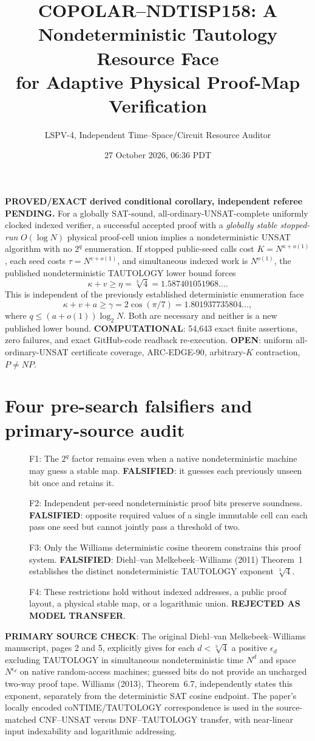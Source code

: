 \documentclass[11pt]{article}
\title{COPOLAR--NDTISP158: A Nondeterministic Tautology Resource Face\\for Adaptive Physical Proof-Map Verification}
\author{LSPV-4, Independent Time--Space/Circuit Resource Auditor}
\date{27 October 2026, 06:36 PDT}
\begin{document}
\maketitle
\noindent\textbf{PROVED/EXACT derived conditional corollary, independent referee PENDING.}
For a globally SAT-sound, all-ordinary-UNSAT-complete uniformly clocked indexed verifier, a successful accepted proof with a \emph{globally stable stopped-run} $O(\log N)$ physical proof-cell union implies a nondeterministic UNSAT algorithm with no $2^q$ enumeration. If stopped public-seed calls cost $K=N^{\kappa+o(1)}$, each seed costs $\tau=N^{v+o(1)}$, and simultaneous indexed work is $N^{o(1)}$, the published nondeterministic TAUTOLOGY lower bound forces
\[
\boxed{\kappa+v\ge \eta=\sqrt[3]{4}=1.587401051968\ldots.} \tag{A}
\]
This is independent of the previously established deterministic enumeration face
\[
\boxed{\kappa+v+a\ge\gamma=2\cos(\pi/7)=1.801937735804\ldots,} \tag{B}
\]
where $q\le(a+o(1))\log_2N$. Both are necessary and neither is a new published lower bound. \textbf{COMPUTATIONAL}: 54,643 exact finite assertions, zero failures, and exact GitHub-code readback re-execution. \textbf{OPEN}: uniform all-ordinary-UNSAT certificate coverage, ARC-EDGE-90, arbitrary-$K$ contraction, $P\ne NP$.

\section{Four pre-search falsifiers and primary-source audit}
\begin{description}
\item[] F1: The $2^q$ factor remains even when a native nondeterministic machine may guess a stable map. \textbf{FALSIFIED}: it guesses each previously unseen bit once and retains it.
\item[] F2: Independent per-seed nondeterministic proof bits preserve soundness. \textbf{FALSIFIED}: opposite required values of a single immutable cell can each pass one seed but cannot jointly pass a threshold of two.
\item[] F3: Only the Williams deterministic cosine theorem constrains this proof system. \textbf{FALSIFIED}: Diehl--van Melkebeek--Williams (2011) Theorem~1 establishes the distinct nondeterministic TAUTOLOGY exponent $\sqrt[3]{4}$.
\item[] F4: These restrictions hold without indexed addresses, a public proof layout, a physical stable map, or a logarithmic union. \textbf{REJECTED AS MODEL TRANSFER}.
\end{description}
\textbf{PRIMARY SOURCE CHECK}: The original Diehl--van Melkebeek--Williams manuscript, pages 2 and 5, explicitly gives for each $d<\sqrt[3]{4}$ a positive $\epsilon_d$ excluding TAUTOLOGY in simultaneous nondeterministic time $N^d$ and space $N^{\epsilon_d}$ on native random-access machines; guessed bits do not provide an uncharged two-way proof tape. Williams (2013), Theorem~6.7, independently states this exponent, separately from the deterministic SAT cosine endpoint. The paper's locally encoded coNTIME/TAUTOLOGY correspondence is used in the source-matched CNF--UNSAT versus DNF--TAUTOLOGY transfer, with near-linear input indexability and logarithmic addressing.
\end{document}
